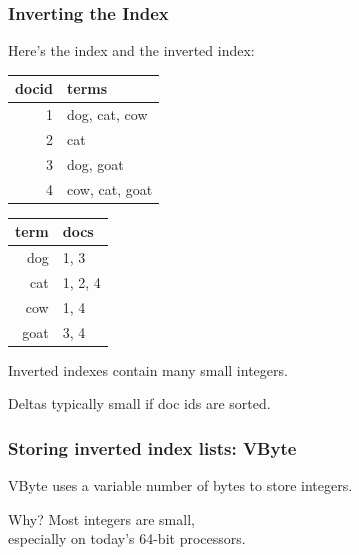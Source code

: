 \begin{frame}
\frametitle{Inverting the Index}


Here's the index and the inverted index:
\begin{center}
\begin{tabular}{r|l}
docid & terms \\ \hline
1 & dog, cat, cow\\
2 & cat\\
3 & dog, goat\\
4 & cow, cat, goat\\
\end{tabular} \hspace*{2em}
\begin{tabular}{r|l}
term & docs \\ \hline
dog & 1, 3 \\
cat & 1, 2, 4 \\
cow & 1, 4 \\
goat & 3, 4
\end{tabular}
\end{center}

Inverted indexes contain many small integers.

Deltas typically small if doc ids are sorted.


\end{frame}


\begin{frame}
\frametitle{Storing inverted index lists: VByte}


\vspace*{-2em}
VByte uses a variable number of bytes
to store integers.  

Why? Most integers are
small,\\
\qquad especially on today's 64-bit processors.

\end{frame}


